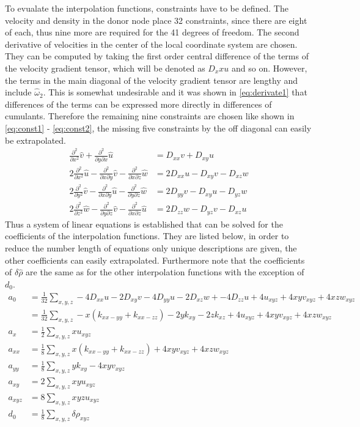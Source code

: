 To evualate the interpolation functions, constraints have to be defined. The velocity and density in the donor node place 32 constraints, since there are eight of each, thus nine more are required for the 41 degrees of freedom. The second derivative of velocities in the center of the local coordinate system are chosen. They can be computed by taking the first order central difference of the terms of the velocity gradient tensor, which will be denoted as $D_xx u$ and so on. However, the terms in the main diagonal of the velocity gradient tensor are lengthy and include $\hat{\omega}_2$. This is somewhat undesirable and it was shown in \eqref{eq:derivate1} that differences of the terms can be expressed more directly in differences of cumulants. Therefore the remaining nine constraints are chosen like shown in \eqref{eq:const1} - \eqref{eq:const2}, the missing five constraints by the off diagonal can easily be extrapolated. 
\begin{align}
	\frac{\partial^2}{\partial x^2} \hat{v}+\frac{\partial^2}{\partial y \partial x} \hat{u} &= D_{xx} v + D_{xy} u \label{eq:const1} \\
	2\frac{\partial^2}{\partial x^2} \hat{u} - \frac{\partial^2}{\partial x \partial y} \hat{v} - \frac{\partial^2}{\partial x \partial z} \hat{w} &= 2 D_{xx}u- D_{xy}v - D_{xz}w \\
	2\frac{\partial^2}{\partial y^2} \hat{v} - \frac{\partial^2}{\partial x \partial y} \hat{u} - \frac{\partial^2}{\partial y \partial z} \hat{w} &= 2 D_{yy}v- D_{xy}u - D_{yz}w \\
	2\frac{\partial^2}{\partial z^2} \hat{w} - \frac{\partial^2}{\partial y \partial z} \hat{v} - \frac{\partial^2}{\partial x \partial z} \hat{u} &= 2 D_{zz}w- D_{yz}v - D_{xz}u \label{eq:const2}
\end{align}
Thus a system of linear equations is established that can be solved for the coefficients of the interpolation functions. They are listed below, in order to reduce the number length of equations only unique descriptions are given, the other coefficients can easily extrapolated. Furthermore note that the coefficients of $\delta \hat{\rho}$ are the same as for the other interpolation functions with the exception of $d_0$. 
\begin{align}
	a_0 &= \frac{1}{32} \sum_{x,y,z}  -4 D_{xx}u-2 D_{xy}v -4D_{yy}u- 2 D_{xz}w + -4 D_{zz}u + 4 u_{xyz} + 4xyv_{xyz} + 4 xzw_{xyz} \\
	&= \frac{1}{32} \sum_{x,y,z}  -x\left(k_{xx-yy} + k_{xx-zz}\right) - 2yk_{xy} -2zk_{xz} + 4 u_{xyz} + 4xyv_{xyz} + 4 xzw_{xyz} \\
	a_x &= \frac{1}{2} \sum_{x,y,z} x u_{xyz} \\
	a_{xx} &= \frac{1}{8} \sum_{x,y,z}x\left(k_{xx-yy}+k_{xx-zz}\right) + 4xyv_{xyz}+ 4 xzw_{xyz} \\
	a_{yy} &= \frac{1}{8} \sum_{x,y,z}y k_{xy} - 4 xy v_{xyz} \\
	a_{xy} &= 2 \sum_{x,y,z} xyu_{xyz} \\
	a_{xyz} &= 8 \sum_{x,y,z} xyzu_{xyz} \\
	d_0 &= \frac{1}{8} \sum_{x,y,z} \delta \rho_{xyz} 
\end{align}
